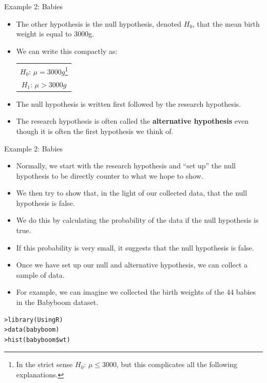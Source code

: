 \documentclass[handout]{beamer}
\begin{document}
\begin{frame}{Example 2: Babies}
\scriptsize{
\begin{itemize}

  \item The other hypothesis is the null hypothesis, denoted $H_0$, that the mean birth weight is equal to 3000g.
\item We can write this compactly as:
\begin{table}
\center
 \begin{tabular}{c}  
$H_0$: $\mu=3000g$\footnote{In the strict sense $H_0$: $\mu \leq 3000$, but this complicates all the following explanations. } \\
$H_1$: $\mu>3000g$
\end{tabular} 
\end{table}

\item The null hypothesis is written first followed by the research hypothesis. 
\item The research hypothesis is often called the \textbf{alternative hypothesis} even though it is often the first hypothesis we think of.

\end{itemize}


} 
\end{frame}


\begin{frame}[fragile]{Example 2: Babies}
\scriptsize{
\begin{itemize}
  \item Normally, we start with the research hypothesis and ``set up'' the null hypothesis to be directly counter to what we hope to show. 
  \item We then try to show that, in the light of our collected data, that the null hypothesis is false. 
  \item We do this by calculating the probability of the data if the null hypothesis is true. 
  \item If this probability is very small, it suggests that the null hypothesis is false.
  \item Once we have set up our null and alternative hypothesis, we can collect a sample of data. 
  \item For example, we can imagine we collected the birth weights of the 44 babies in the Babyboom dataset.

\end{itemize}
\begin{verbatim}
>library(UsingR)
>data(babyboom)
>hist(babyboom$wt)
\end{verbatim}


} 
\end{frame}
\end{document}

